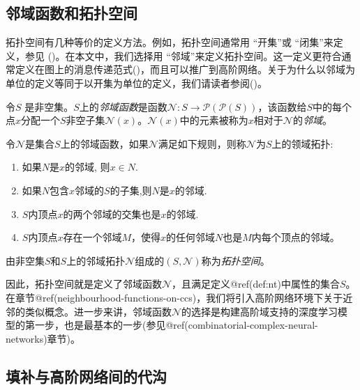 \documentclass[
  12pt,
]{krantz}
\providecommand{\tightlist}{%
  \setlength{\itemsep}{0pt}\setlength{\parskip}{0pt}}
\begin{document}
\subsection{邻域函数和拓扑空间}\label{ux90bbux57dfux51fdux6570ux548cux62d3ux6251ux7a7aux95f4}

拓扑空间有几种等价的定义方法。例如，拓扑空间通常用 ``开集''或
``闭集''来定义，参见 ()。在本文中，我们选择用
``邻域''来定义拓扑空间。这一定义更符合通常定义在图上的消息传递范式()，而且可以推广到高阶网络。关于为什么以邻域为单位的定义等同于以开集为单位的定义，我们请读者参阅()。

\label{ns}
令\(S\)
是非空集。\(S\)上的\emph{邻域函数}是函数\(\mathcal{N}\colon S\to\mathcal{P}(\mathcal{P}(S))\)，该函数给\(S\)中的每个点\(x\)分配一个\(S\)非空子集\(\mathcal{N}(x)\)。\(\mathcal{N}(x)\)中的元素被称为\(x\)相对于\(\mathcal{N}\)的\emph{邻域}。

\label{nt}
令\(\mathcal{N}\)是集合\(S\)上的邻域函数，如果\(\mathcal{N}\)满足如下规则，则称\(\mathcal{N}\)为\(S\)上的领域拓扑:

\begin{enumerate}
\def\labelenumi{\arabic{enumi}.}
\tightlist
\item
  如果\(N\)是\(x\)的邻域, 则\(x\in N\).
\item
  如果\(N\)包含\(x\)邻域的\(S\)的子集,则\(N\)是\(x\)的邻域.
\item
  \(S\)内顶点\(x\)的两个邻域的交集也是\(x\)的邻域.
\item
  \(S\)内顶点\(x\)存在一个邻域\(M\)，使得\(x\)的任何邻域\(N\)也是\(M\)内每个顶点的邻域。
\end{enumerate}

\label{topospace}
由非空集\(S\)和\(S\)上的邻域拓扑\(\mathcal{N}\)组成的\((S,\mathcal{N})\)称为\emph{拓扑空间}。

因此，拓扑空间就是定义了邻域函数\(\mathcal{N}\)，且满足定义@ref(def:nt)中属性的集合\(S\)。在章节@ref(neighbourhood-functions-on-ccs)，我们将引入高阶网络环境下关于近邻的类似概念。进一步来讲，邻域函数\(\mathcal{N}\)的选择是构建高阶域支持的深度学习模型的第一步，也是最基本的一步(参见@ref(combinatorial-complex-neural-networks)章节)。

\subsection{填补与高阶网络间的代沟}\label{bridging-the-gap-among-higher-order-networks}
\end{document}
